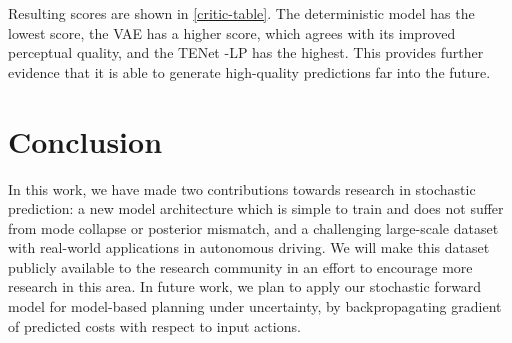 \documentclass{article}
\newcommand{\modelname}{TENet }
\begin{document}
Resulting scores are shown in \cref{critic-table}.
The deterministic model has the lowest score, the VAE has a higher score, which agrees with its improved perceptual quality, and the \modelname-LP has the highest.
This provides further evidence that it is able to generate high-quality predictions far into the future.




\section{Conclusion}

In this work, we have made two contributions towards research in stochastic prediction: a new model architecture which is simple to train and does not suffer from mode collapse or posterior mismatch, and a challenging large-scale dataset with real-world applications in autonomous driving.
We will make this dataset publicly available to the research community in an effort to encourage more research in this area.
In future work, we plan to apply our stochastic forward model for model-based planning under uncertainty, by backpropagating gradient of predicted costs with respect to input actions.










%
%
%
%
%
%
\end{document}
